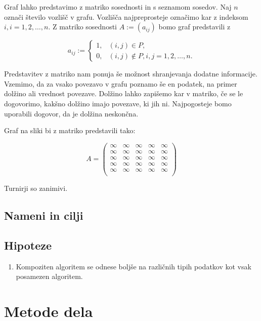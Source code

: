 \documentclass[a4paper,oneside]{article}
\begin{document}
Graf lahko predstavimo z matriko sosednosti in s seznamom sosedov.
Naj $n$ označi število vozlišč v grafu. Vozlišča najpreprosteje označimo kar z indeksom $i,
i = 1, 2, \ldots, n$. Z matriko sosednosti $A := (a_{ij})$ bomo graf predstavili z 

\[ a_{ij} := 
\left\{
\begin{array}{ll}
  1,& (i, j) \in P, \\
  0,& (i, j) \notin P, i, j = 1, 2, \ldots, n. 
\end{array}
\right. %
\]
 

Predstavitev z matriko nam ponuja še možnost shranjevanja dodatne informacije. Vzemimo, da
za vsako povezavo v grafu poznamo še en podatek, na primer dolžino ali vrednost povezave.
Dolžino lahko zapišemo kar v matriko, če se le dogovorimo, kakšno dolžino imajo povezave,
ki jih ni. Najpogosteje bomo uporabili dogovor, da je dolžina neskončna.

Graf na sliki bi z matriko predstavili tako:

\[
A = \left(
\begin{array}{ccccc}
  \infty & \infty & \infty & \infty & \infty \\
  \infty & \infty & \infty & \infty & \infty \\
  \infty & \infty & \infty & \infty & \infty \\
  \infty & \infty & \infty & \infty & \infty \\
  \infty & \infty & \infty & \infty & \infty \\
\end{array}
\right)
\]

Turnirji so zanimivi.



\subsection{Nameni in cilji}
\subsection{Hipoteze}
\begin{enumerate}
  \item Kompoziten algoritem se odnese boljše na različnih tipih podatkov kot vsak
    posamezen algoritem.
\end{enumerate}
\section{Metode dela}
\end{document}
